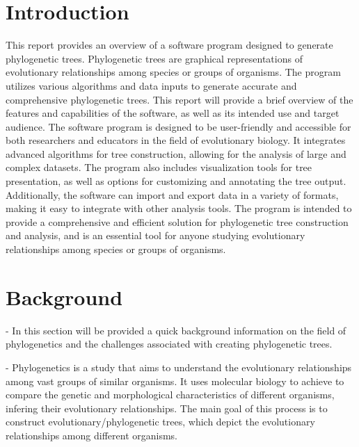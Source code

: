 \documentclass[12pt]{article}
\begin{document}

\newpage
{}

\tableofcontents

\newpage
{}

\section{Introduction}\label{sec:introducao} %
This report provides an overview of a software program designed to generate phylogenetic trees. Phylogenetic trees are graphical representations of evolutionary relationships among species or groups of organisms. The program utilizes various algorithms and data inputs to generate accurate and comprehensive phylogenetic trees. This report will provide a brief overview of the features and capabilities of the software, as well as its intended use and target audience. The software program is designed to be user-friendly and accessible for both researchers and educators in the field of evolutionary biology. It integrates advanced algorithms for tree construction, allowing for the analysis of large and complex datasets. The program also includes visualization tools for tree presentation, as well as options for customizing and annotating the tree output. Additionally, the software can import and export data in a variety of formats, making it easy to integrate with other analysis tools. The program is intended to provide a comprehensive and efficient solution for phylogenetic tree construction and analysis, and is an essential tool for anyone studying evolutionary relationships among species or groups of organisms.

\section{Background}\label{sec:desenvolvimentos}

- In this section will be provided a quick background information on the field of phylogenetics and the challenges associated with creating phylogenetic trees.

- Phylogenetics is a study that aims to understand the evolutionary relationships among vast groups of similar organisms. It uses molecular biology to achieve to compare the genetic and morphological characteristics of different organisms, infering their evolutionary relationships. The main goal of this process is to construct evolutionary/phylogenetic trees, which depict the evolutionary relationships among different organisms.
\end{document}
